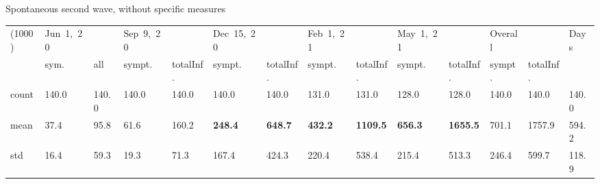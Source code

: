 \documentclass[8pt]{beamer}
\begin{document}
\begin{frame}{Spontaneous second wave, without specific measures}
\begin{table}[H]
\center
\tiny
\begin{tabular}{p{0.3cm}p{0.3cm}p{0.3cm}p{0.3cm}p{0.3cm}p{0.3cm}p{0.3cm}p{0.3cm}p{0.3cm}p{0.3cm}p{0.3cm}p{0.3cm}p{0.3cm}p{0.4cm}}
\toprule
(1000) &  Jun~1,~20 & &  Sep~9,~20 & & Dec~15,~20 & & Feb~1,~21 & & May~1,~21 & & Overall  & & Days \\
{} &  sym. &  all &  sympt. &  totalInf. &  sympt. &  totalInf. &  sympt. &  totalInf. &  sympt. &  totalInf. &  sympt. &  totalInf.  & \\
\midrule
count &    140.0 &                      140.0 &    140.0 &                      140.0 &    140.0 &                      140.0 &    131.0 &                      131.0 &    128.0 &                      128.0 &               140.0 &                   140.0 &  140.0 \\
mean  &     37.4 &                       95.8 &     61.6 &                      160.2 &    \textbf{248.4} &                      \textbf{648.7} &    \textbf{432.2} &                     \textbf{1109.5} &    \textbf{656.3} &                     \textbf{1655.5} &               701.1 &                  1757.9 &  594.2 \\
std   &     16.4 &                       59.3 &     19.3 &                       71.3 &    167.4 &                      424.3 &    220.4 &                      538.4 &    215.4 &                      513.3 &               246.4 &                   599.7 &  118.9 \\
\bottomrule
\end{tabular}

\label{selSpontWave2Tab}
\end{table}


\end{frame}
\end{document}
